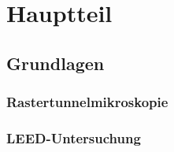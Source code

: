 \documentclass[a4paper,11pt,oneside,final,german,openbib,pdftex]{scrbook}
\begin{document}
\chapter{Hauptteil}




\section{Grundlagen}

% 
\subsection{Rastertunnelmikroskopie}

\subsection{LEED-Untersuchung}



% 
 
% 
% 
% 
% 



% 
\end{document}
